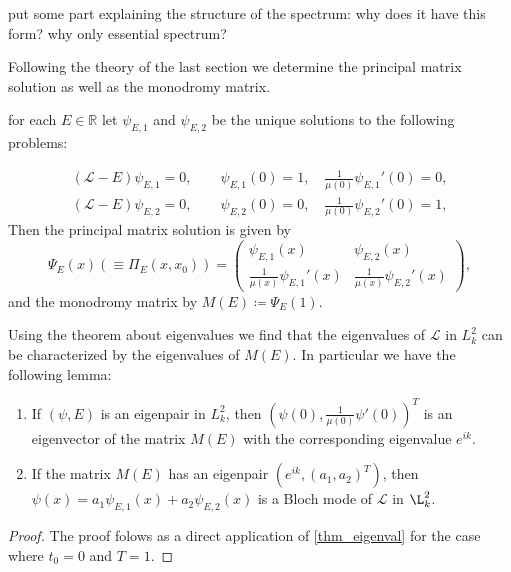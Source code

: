 put some part explaining the structure of the spectrum:
why does it have this form? why only essential spectrum?

Following the theory of the last section we determine the principal matrix solution as well as the monodromy matrix.

for each $E \in \mathbb{R}$ let $\psi_{E,1}$ and $\psi_{E,2}$ be the unique solutions to the following problems:

\begin{align}
    (\mathcal{L}-E) \psi_{E,1} = 0,\qquad \psi_{E,1}(0) = 1,\quad \frac{1}{\mu(0)} \psi_{E,1}'(0) = 0,\\
    (\mathcal{L}-E) \psi_{E,2} = 0,\qquad \psi_{E,2}(0) = 0,\quad \frac{1}{\mu(0)} \psi_{E,2}'(0) = 1,
\end{align}
Then the principal matrix solution is given by
\begin{equation}
    \Psi_E(x) (\equiv \Pi_E(x,x_0)) = 
    \begin{pmatrix}
        \psi_{E,1}(x) & \psi_{E,2}(x)\\
        \frac{1}{\mu(x)}\psi_{E,1}'(x) & \frac{1}{\mu(x)}\psi_{E,2}'(x)
    \end{pmatrix},
\end{equation}
and the monodromy matrix by $M(E) \coloneqq \Psi_E(1)$.

Using the theorem about eigenvalues we find that the eigenvalues of $\mathcal{L}$ in $L_k^2$ can be characterized by the eigenvalues of $M(E)$. In particular we have the following lemma:
\begin{lemma}\label{lemma_eigenval}
    \begin{enumerate}
        \item If $(\psi,E)$ is an eigenpair in $L_k^2$, then $(\psi(0),\frac{1}{\mu(0)}\psi'(0))^T$ is an eigenvector of the matrix $M(E)$ with the corresponding eigenvalue $e^{ik}$.
        \item If the matrix $M(E)$ has an eigenpair $(e^{ik},(a_1,a_2)^T)$, then $\psi(x) = a_1 \psi_{E,1}(x)+a_2\psi_{E,2}(x)$ is a Bloch mode of $\mathcal{L}$ in $\L_k^2$.
    \end{enumerate}
\end{lemma}
\begin{proof}
    The proof folows as a direct application of \eqref{thm_eigenval} for the case where $t_0 = 0$ and $T=1$.
\end{proof}

